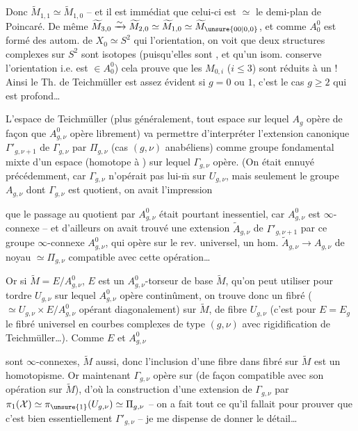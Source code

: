 Donc $\widetilde M_{1,1}\simeq\widetilde M_{1,0}$ -- et il est immédiat que celui-ci est $\simeq$ le demi-plan de Poincaré. De même
$\widetilde M_{3,0}\xrightarrow{\sim}\widetilde M_{2,0}\simeq\widetilde M_{1,0}\simeq\widetilde M_{\unsure{00|0,0}}$,
et comme $A_0^0$ est  formé des autom. de $X_0\simeq S^2$ qui  l'orientation, on voit que deux structures complexes sur $S^2$ sont isotopes (puisqu'elles sont , et qu'un isom. conserve l'orientation i.e. est $\in A_0^0$) cela prouve que les $M_{0,i}$ ($i\leq 3$) sont réduits à un  ! Ainsi le Th. de Teichmüller est assez évident si $g=0$ ou $1$, c'est le cas $g\geq 2$ qui est profond\ldots

L'espace de Teichmüller (plus généralement, tout  espace  sur lequel $A_g$ opère de façon que $A_{g,\nu}^0$ opère librement) va permettre d'interpréter l'extension canonique $\Gamma'_{g,\nu+1}$ de $\Gamma_{g,\nu}$ par $\Pi_{g,\nu}$ (cas $(g,\nu)$ anabéliens) comme groupe fondamental mixte d'un espace  (homotope à ) sur lequel $\Gamma_{g,\nu}$ opère. (On était ennuyé précédemment, car $\Gamma_{g,\nu}$ n'opérait pas lui-$\overline{\mathrm m}$ sur $U_{g,\nu}$, mais seulement le groupe $A_{g,\nu}$ dont $\Gamma_{g,\nu}$ est quotient, on avait l'impression

que le passage au quotient par $A_{g,\nu}^0$ était pourtant inessentiel, car $A_{g,\nu}^0$ est $\infty$-connexe -- et d'ailleurs on avait trouvé une extension $\widetilde A_{g,\nu}$ de $\Gamma'_{g,\nu+1}$ par ce  groupe $\infty$-connexe $A_{g,\nu}^0$, qui opère sur le rev. universel,    un hom.  $\widetilde A_{g,\nu}\to A_{g,\nu}$ de noyau $\simeq\Pi_{g,\nu}$ compatible avec cette opération\ldots

Or si $\widetilde M=E/A_{g,\nu}^0$, $E$ est un $A_{g,\nu}^0$-torseur de base $\widetilde M$, qu'on peut utiliser pour tordre  $U_{g,\nu}$ sur lequel $A_{g,\nu}^0$ opère continûment, on trouve donc un fibré  ($\simeq U_{g,\nu}\times E/A_{g,\nu}^0$ opérant diagonalement) sur $\widetilde M$, de fibre $U_{g,\nu}$ (c'est pour $E=E_g$ le fibré universel en courbes complexes de type $(g,\nu)$ avec rigidification de Teichmüller\ldots). Comme $E$ et $A_{g,\nu}^0$

sont $\infty$-connexes, $\widetilde M$ aussi, donc l'inclusion d'une fibre dans  fibré  sur $\widetilde M$ est un homotopisme. Or maintenant $\Gamma_{g,\nu}$ opère sur  (de façon compatible avec son opération sur $\widetilde M$), d'où la construction d'une extension de $\Gamma_{g,\nu}$ par $\pi_1(\mathcal X)\simeq\pi_{\unsure{1}}(U_{g,\nu})\simeq\Pi_{g,\nu}$ -- on a fait tout ce qu'il fallait pour prouver que c'est bien essentiellement $\Gamma'_{g,\nu}$ -- je me dispense de donner le détail\ldots

